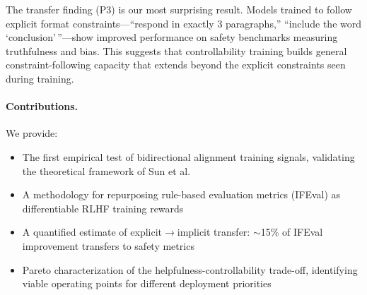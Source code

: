 The transfer finding (P3) is our most surprising result. Models trained to follow explicit format constraints---``respond in exactly 3 paragraphs,'' ``include the word `conclusion'\,''---show improved performance on safety benchmarks measuring truthfulness and bias. This suggests that controllability training builds general constraint-following capacity that extends beyond the explicit constraints seen during training.

\paragraph{Contributions.} We provide:
\begin{itemize}
    \item The first empirical test of bidirectional alignment training signals, validating the theoretical framework of Sun et al.\ \citep{sun2024bidirectional}
    \item A methodology for repurposing rule-based evaluation metrics (IFEval) as differentiable RLHF training rewards
    \item A quantified estimate of explicit$\rightarrow$implicit transfer: $\sim$15\% of IFEval improvement transfers to safety metrics
    \item Pareto characterization of the helpfulness-controllability trade-off, identifying viable operating points for different deployment priorities
\end{itemize}
